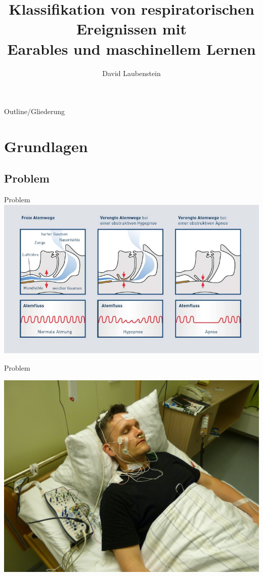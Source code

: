 \documentclass[18pt]{beamer}
\title[]{Klassifikation von respiratorischen Ereignissen mit \\ Earables und maschinellem Lernen}
\subtitle{}
\author{David Laubenstein}
\institute{Institut für Telematik: Pervasive Computing Systems / TECO}
\begin{document}

\begin{frame}
\titlepage
\end{frame}

\begin{frame}{Outline/Gliederung}
\tableofcontents
\end{frame}

\section{Grundlagen}
\subsection{Problem}
\begin{frame}{Problem}
    \includegraphics[scale=0.4]{../Proposal/logos/was-passiert-bei-schlafapnoe}
\end{frame}

\begin{frame}{Problem}
    \begin{center}
        \includegraphics[scale=0.12]{../Proposal/logos/sleepLabor}
    \end{center}
\end{frame}
\end{document}
